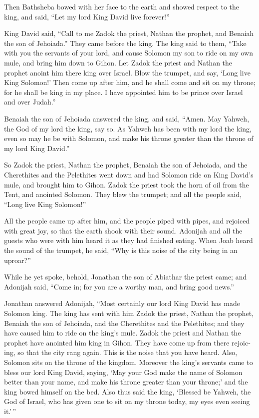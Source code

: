 \begin{paracol}{2}
\begin{otherlanguage}{english}
 Then Bathsheba bowed with her face to the earth and
showed respect to the king, and said, ``Let my lord King David live
forever!''

 King David said, ``Call to me Zadok the priest, Nathan
the prophet, and Benaiah the son of Jehoiada.'' They came before the
king.  The king said to them, ``Take with you the
servants of your lord, and cause Solomon my son to ride on my own mule,
and bring him down to Gihon.  Let Zadok the priest and
Nathan the prophet anoint him there king over Israel. Blow the trumpet,
and say, `Long live King Solomon!'  Then come up after
him, and he shall come and sit on my throne; for he shall be king in my
place. I have appointed him to be prince over Israel and over Judah.''

 Benaiah the son of Jehoiada answered the king, and said,
``Amen. May Yahweh, the God of my lord the king, say so. 
As Yahweh has been with my lord the king, even so may he be with
Solomon, and make his throne greater than the throne of my lord King
David.''

 So Zadok the priest, Nathan the prophet, Benaiah the son
of Jehoiada, and the Cherethites and the Pelethites went down and had
Solomon ride on King David's mule, and brought him to Gihon.
 Zadok the priest took the horn of oil from the Tent, and
anointed Solomon. They blew the trumpet; and all the people said, ``Long
live King Solomon!''

 All the people came up after him, and the people piped
with pipes, and rejoiced with great joy, so that the earth shook with
their sound.  Adonijah and all the guests who were with
him heard it as they had finished eating. When Joab heard the sound of
the trumpet, he said, ``Why is this noise of the city being in an
uproar?''

 While he yet spoke, behold, Jonathan the son of Abiathar
the priest came; and Adonijah said, ``Come in; for you are a worthy man,
and bring good news.''

 Jonathan answered Adonijah, ``Most certainly our lord
King David has made Solomon king.  The king has sent with
him Zadok the priest, Nathan the prophet, Benaiah the son of Jehoiada,
and the Cherethites and the Pelethites; and they have caused him to ride
on the king's mule.  Zadok the priest and Nathan the
prophet have anointed him king in Gihon. They have come up from there
rejoicing, so that the city rang again. This is the noise that you have
heard.  Also, Solomon sits on the throne of the kingdom.
 Moreover the king's servants came to bless our lord King
David, saying, `May your God make the name of Solomon better than your
name, and make his throne greater than your throne;' and the king bowed
himself on the bed.  Also thus said the king, `Blessed be
Yahweh, the God of Israel, who has given one to sit on my throne today,
my eyes even seeing it.'\,''


\end{otherlanguage}
\end{paracol}
